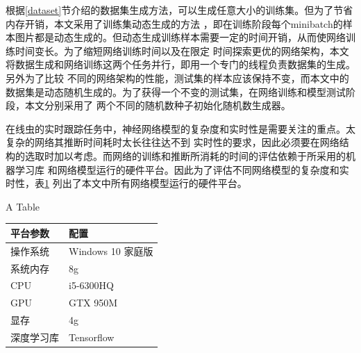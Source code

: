 	根据\ref{dataset}节介绍的数据集生成方法，可以生成任意大小的训练集。但为了节省内存开销，本文采用了训练集动态生成的方法
	，即在训练阶段每个minibatch的样本图片都是动态生成的。但动态生成训练样本需要一定的时间开销，从而使网络训练时间变长。为了缩短网络训练时间以及在限定
	时间探索更优的网络架构，本文将数据生成和网络训练这两个任务并行，即用一个专门的线程负责数据集的生成。另外为了比较
	不同的网络架构的性能，测试集的样本应该保持不变，而本文中的数据集是动态随机生成的。为了获得一个不变的测试集，在网络训练和模型测试阶段，本文分别采用了
	两个不同的随机数种子初始化随机数生成器。
	
	在线虫的实时跟踪任务中，神经网络模型的复杂度和实时性是需要关注的重点。太复杂的网络其推断时间耗时太长往往达不到
	实时性的要求，因此必须要在网络结构的选取时加以考虑。而网络的训练和推断所消耗的时间的评估依赖于所采用的机器学习库
	和网络模型运行的硬件平台。因此为了评估不同网络模型的复杂度和实时性，表\ref{tab:hardwareconfig}
	列出了本文中所有网络模型运行的硬件平台。
	\begin{table}[!hpb]
	\centering
    {A Table}
	\label{tab:hardwareconfig}
	\begin{tabular}{p{80pt}p{100pt}}
	\toprule
	平台参数 & 配置 \\
	\midrule
	操作系统 & Windows 10 家庭版\\
	系统内存 & 8g \\
	CPU & i5-6300HQ \\
	GPU & GTX 950M \\
	显存 & 4g \\
	深度学习库 & Tensorflow \\
	\bottomrule
\end{tabular}
\end{table}
	

